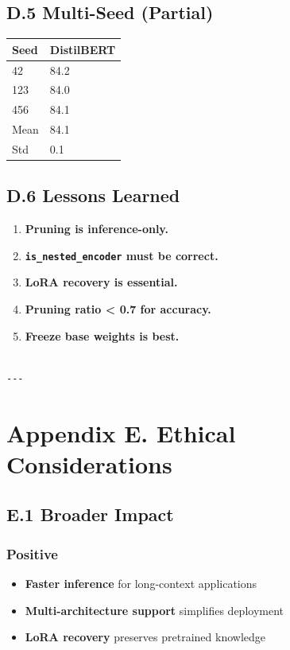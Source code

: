 \subsection{D.5 Multi-Seed (Partial)}

\begin{table}[H]
\centering
\small
\begin{tabular}{ll}
\toprule
\textbf{Seed} & \textbf{DistilBERT} \\
\midrule
42 & 84.2 \\
123 & 84.0 \\
456 & 84.1 \\
Mean & 84.1 \\
Std & 0.1 \\
\bottomrule
\end{tabular}
\end{table}

\subsection{D.6 Lessons Learned}

\begin{enumerate}
\item \textbf{Pruning is inference-only.}
\item \textbf{\texttt{is\_nested\_encoder} must be correct.}
\item \textbf{LoRA recovery is essential.}
\item \textbf{Pruning ratio \textless{} 0.7 for accuracy.}
\item \textbf{Freeze base weights is best.}
\end{enumerate}
\begin{lstlisting}

---
\end{lstlisting}


\section{Appendix E. Ethical Considerations}

\subsection{E.1 Broader Impact}

\subsubsection{Positive}
\begin{itemize}
\item \textbf{Faster inference} for long-context applications
\item \textbf{Multi-architecture support} simplifies deployment
\item \textbf{LoRA recovery} preserves pretrained knowledge

\end{itemize}

